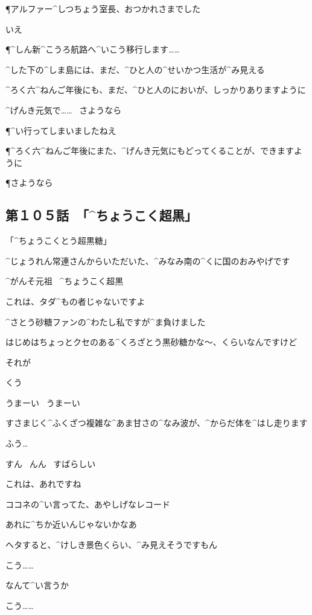 \P アルファー^{しつちょう}{室長}、おつかれさまでした

\AM いえ

\P ^{しん}{新}^{こうろ}{航路}へ^{いこう}{移行}します……

\page
\AM ^{した}{下}の^{しま}{島}には、まだ、^{ひと}{人}の^{せいかつ}{生活}が^{み}{見}える

\AM ^{ろく}{六}^{ねんご}{年後}にも、まだ、^{ひと}{人}のにおいが、しっかりありますように

\AM ^{げんき}{元気}で……
\ さようなら

\page
\P ^{い}{行}ってしまいましたねえ

\page
\P ^{ろく}{六}^{ねんご}{年後}にまた、^{げんき}{元気}にもどってくることが、できますように

\P さようなら


\subsection{第１０５話\ 「^{ちょうこく}{超黒}」}

\page[74]
\A 「^{ちょうこくとう}{超黒糖}」

\A ^{じょうれん}{常連}さんからいただいた、^{みなみ}{南}の^{くに}{国}のおみやげです

\Sign ^{がんそ}{元祖}
\ ^{ちょうこく}{超黒}

\A これは、タダ^{もの}{者}じゃないですよ

\A ^{さとう}{砂糖}ファンの^{わたし}{私}ですが^{ま}{負}けました

\page
\A はじめはちょっとクセのある^{くろざとう}{黒砂糖}かな〜、くらいなんですけど

\A それが

\page
\A くう

\A うまーい
\ うまーい

\A すさまじく^{ふくざつ}{複雑}な^{あま}{甘}さの^{なみ}{波}が、^{からだ}{体}を^{はし}{走}ります

\page
\A ふう…

\A すん
\ んん
\ すばらしい

\A これは、あれですね

\A ココネの^{い}{言}ってた、あやしげなレコード

\A あれに^{ちか}{近}いんじゃないかなあ

\A ヘタすると、^{けしき}{景色}くらい、^{み}{見}えそうですもん

\A こう……

\A なんて^{い}{言}うか

\A こう……

